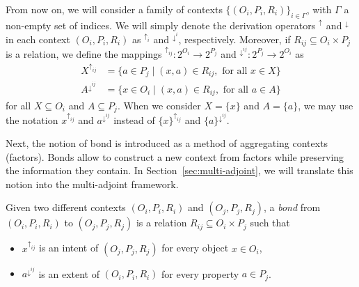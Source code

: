 \documentclass[runningheads,a4paper]{llncs}
\newcommand{\K}{\mathbb{K}}
\newcommand{\calC}{\mathcal C}
\newcommand{\up}[1][]{{^{\uparrow_{#1}}}}
\newcommand{\down}[1][]{{^{\downarrow^{#1}}}}
\begin{document}
	




From now on, we will consider a family of contexts $\{(O_i, P_i, R_i)\}_{i \in \Gamma}$, with $\Gamma$ a non-empty set of indices. We will simply denote the derivation operators $\up$ and $\down$ in each context $(O_i, P_i, R_i)$ as $\up[i]$ and $\down[i]$, respectively. Moreover, if $R_{ij} \subseteq O_i \times P_j$ is a relation, we define the mappings $\up[ij] \colon 2^{O_i} \to 2^{P_j}$ and $\down[ij] \colon 2^{P_j} \to 2^{O_i}$ as
\begin{align*}
	X\up[ij] &= \{a \in P_j \mid (x, a) \in R_{ij}, \text{ for all $x \in X$}\} \\
	A\down[ij] &= \{x \in O_i \mid (x, a) \in R_{ij}, \text{ for all $a \in A$}\}
\end{align*}
for all $X \subseteq O_i$ and $A \subseteq P_j$. When we consider $X = \{x\}$ and $A = \{a\}$, we may use the notation $x\up[ij]$ and $a\down[ij]$ instead of $\{x\}\up[ij]$ and $\{a\}\down[ij]$.

Next, the notion of bond is introduced as a method of aggregating contexts (factors). Bonds allow to construct a new context from factors while preserving the information they contain. In Section~\ref{sec:multi-adjoint}, we will translate this notion into the multi-adjoint framework.

\begin{definition}\label{def:bond}

Given two different contexts $(O_i, P_i, R_i)$ and $(O_j, P_j, R_j)$, a \emph{bond} from $(O_i, P_i, R_i)$ to $(O_j, P_j, R_j)$ is a relation $R_{ij} \subseteq O_i \times P_j$ such that
\begin{itemize}
	\item $x\up[ij]$ is an intent of $(O_j, P_j, R_j)$ for every object $x \in O_i$,
	\item $a\down[ij]$ is an extent of $(O_i, P_i, R_i)$ for every property $a \in P_j$.
\end{itemize}

\end{definition}
\end{document}
